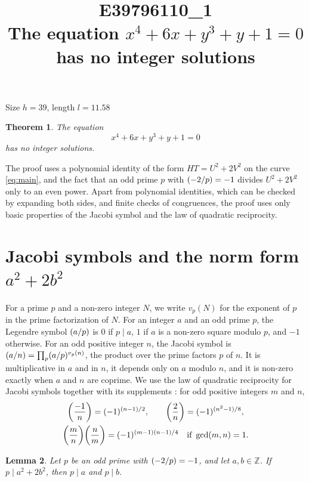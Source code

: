 \documentclass[11pt]{article}
\title{\textbf{E39796110\_1}\\[4pt] {\Large The equation $x^{4}+6x+y^{3}+y+1=0$ has no integer solutions}}
\author{}
\date{}
\newtheorem{theorem}{Theorem}
\newtheorem{lemma}[theorem]{Lemma}
\newcommand{\Z}{\mathbb{Z}}
\newcommand{\leg}[2]{\mathchoice{\biggl(\dfrac{#1}{#2}\biggr)}{(#1/#2)}{(#1/#2)}{(#1/#2)}}
\begin{document}
\maketitle
\vspace{-8ex}
\begin{center}
Size $h=39$, length $l=11.58$
\end{center}

\begin{theorem}\label{thm:main}
The equation
\begin{equation}\label{eq:main}
x^{4}+6x+y^{3}+y+1=0
\end{equation}
has no integer solutions.
\end{theorem}

The proof uses a polynomial identity of the form $HT=U^2+2V^2$ on the curve \eqref{eq:main}, and the fact that an odd prime $p$ with $\leg{-2}{p}=-1$ divides $U^2+2V^2$ only to an even power. Apart from polynomial identities, which can be checked by expanding both sides, and finite checks of congruences, the proof uses only basic properties of the Jacobi symbol and the law of quadratic reciprocity.

\section{\texorpdfstring{Jacobi symbols and the norm form $a^2+2b^2$}{Jacobi symbols and the norm form}}

For a prime $p$ and a non-zero integer $N$, we write $v_p(N)$ for the exponent of $p$ in the prime factorization of $N$. For an integer $a$ and an odd prime $p$, the Legendre symbol $\leg{a}{p}$ is $0$ if $p\mid a$, $1$ if $a$ is a non-zero square modulo $p$, and $-1$ otherwise. For an odd positive integer $n$, the Jacobi symbol is $\leg{a}{n}=\prod_p\leg{a}{p}^{v_p(n)}$, the product over the prime factors $p$ of $n$. It is multiplicative in $a$ and in $n$, it depends only on $a$ modulo $n$, and it is non-zero exactly when $a$ and $n$ are coprime. We use the law of quadratic reciprocity for Jacobi symbols together with its supplements \cite[Chapter~5, \S2]{IR}: for odd positive integers $m$ and $n$,
\begin{gather*}
\leg{-1}{n}=(-1)^{(n-1)/2},\qquad\leg{2}{n}=(-1)^{(n^2-1)/8},\\
\leg{m}{n}\leg{n}{m}=(-1)^{(m-1)(n-1)/4}\quad\text{if }\gcd(m,n)=1.
\end{gather*}

\begin{lemma}\label{lem:divides}
Let $p$ be an odd prime with $\leg{-2}{p}=-1$, and let $a,b\in\Z$. If $p\mid a^2+2b^2$, then $p\mid a$ and $p\mid b$.
\end{lemma}
\end{document}
